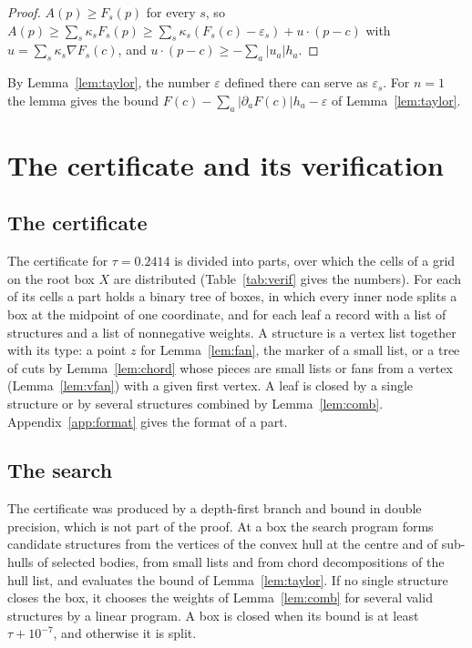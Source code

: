 \documentclass[11pt]{amsart}
\theoremstyle{definition}
\theoremstyle{remark}
\numberwithin{equation}{section}
\newcommand{\TAU}{0.2414}
\begin{document}
\begin{proof}
$A(p)\ge F_s(p)$ for every $s$, so $A(p)\ge\sum_s\kappa_sF_s(p)\ge\sum_s\kappa_s(F_s(c)-\varepsilon_s)+u\cdot(p-c)$ with $u=\sum_s\kappa_s\nabla F_s(c)$, and $u\cdot(p-c)\ge-\sum_a|u_a|h_a$.
\end{proof}

By Lemma~\ref{lem:taylor}, the number $\varepsilon$ defined there can serve as $\varepsilon_s$. For $n=1$ the lemma gives the bound $F(c)-\sum_a|\partial_aF(c)|h_a-\varepsilon$ of Lemma~\ref{lem:taylor}.

\section{The certificate and its verification}\label{sec:cert}

\subsection{The certificate}\label{sec:certdata} The certificate for $\tau=\TAU$ is divided into parts, over which the cells of a grid on the root box $X$ are distributed (Table~\ref{tab:verif} gives the numbers). For each of its cells a part holds a binary tree of boxes, in which every inner node splits a box at the midpoint of one coordinate, and for each leaf a record with a list of structures and a list of nonnegative weights. A structure is a vertex list together with its type: a point $z$ for Lemma~\ref{lem:fan}, the marker of a small list, or a tree of cuts by Lemma~\ref{lem:chord} whose pieces are small lists or fans from a vertex (Lemma~\ref{lem:vfan}) with a given first vertex. A leaf is closed by a single structure or by several structures combined by Lemma~\ref{lem:comb}. Appendix~\ref{app:format} gives the format of a part.

\subsection{The search}\label{sec:search} The certificate was produced by a depth-first branch and bound in double precision, which is not part of the proof. At a box the search program forms candidate structures from the vertices of the convex hull at the centre and of sub-hulls of selected bodies, from small lists and from chord decompositions of the hull list, and evaluates the bound of Lemma~\ref{lem:taylor}. If no single structure closes the box, it chooses the weights of Lemma~\ref{lem:comb} for several valid structures by a linear program. A box is closed when its bound is at least $\tau+10^{-7}$, and otherwise it is split.
\end{document}
